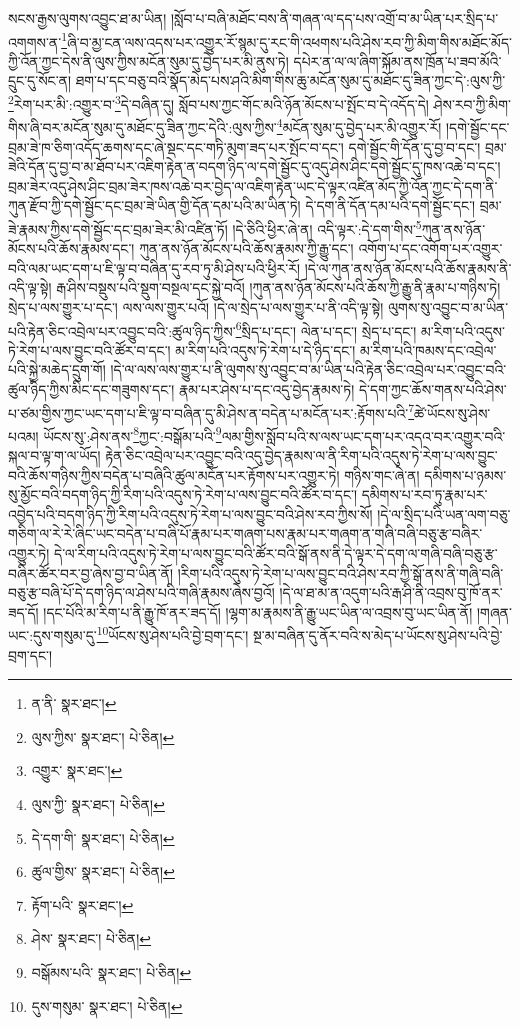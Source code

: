 སངས་རྒྱས་ལུགས་འབྱུང་ཐ་མ་ཡིན། །སློབ་པ་བཞི་མཐོང་བས་ནི་གཞན་ལ་དད་པས་འགྲོ་བ་མ་ཡིན་པར་སྲིད་པ་འགགས་ན་\footnote{ན་ནི་  སྣར་ཐང་། }ཞི་བ་མྱ་ངན་ལས་འདས་པར་འགྱུར་རོ་སྙམ་དུ་རང་གི་འཕགས་པའི་ཤེས་རབ་ཀྱི་མིག་གིས་མཐོང་མོད་ཀྱི་འོན་ཀྱང་དེས་ནི་ལུས་ཀྱིས་མངོན་སུམ་དུ་བྱེད་པར་མི་ནུས་ཏེ། དཔེར་ན་ལ་ལ་ཞིག་སྐོམ་ནས་ཁྲོན་པ་ཟབ་མོའི་དྲུང་དུ་སོང་ན། ཐག་པ་དང་བཅུ་བའི་སྣོད་མེད་པས་ཤའི་མིག་གིས་ཆུ་མངོན་སུམ་དུ་མཐོང་དུ་ཟིན་ཀྱང་དེ་:ལུས་ཀྱི་\footnote{ལུས་ཀྱིས་  སྣར་ཐང་།  པེ་ཅིན། }རེག་པར་མི་:འགྱུར་བ་\footnote{འགྱུར་  སྣར་ཐང་། }དེ་བཞིན་དུ། སློབ་པས་ཀྱང་གོང་མའི་ཉོན་མོངས་པ་སྤོང་བ་དེ་འདོད་དེ། ཤེས་རབ་ཀྱི་མིག་གིས་ཞི་བར་མངོན་སུམ་དུ་མཐོང་དུ་ཟིན་ཀྱང་དེའི་:ལུས་ཀྱིས་\footnote{ལུས་ཀྱི་  སྣར་ཐང་།  པེ་ཅིན། }མངོན་སུམ་དུ་བྱེད་པར་མི་འགྱུར་རོ། །དགེ་སྦྱོང་དང་བྲམ་ཟེ་ཁ་ཅིག་འདོད་ཆགས་དང་ཞེ་སྡང་དང་གཏི་མུག་ཟད་པར་སྤོང་བ་དང་། དགེ་སྦྱོང་གི་དོན་དུ་བྱ་བ་དང་། བྲམ་ཟེའི་དོན་དུ་བྱ་བ་མ་ཐོབ་པར་འཇིག་རྟེན་ན་བདག་ཉིད་ལ་དགེ་སྦྱོང་དུ་འདུ་ཤེས་ཤིང་དགེ་སྦྱོང་དུ་ཁས་འཆེ་བ་དང་། བྲམ་ཟེར་འདུ་ཤེས་ཤིང་བྲམ་ཟེར་ཁས་འཆེ་བར་བྱེད་ལ་འཇིག་རྟེན་ཡང་དེ་ལྟར་འཛིན་མོད་ཀྱི་འོན་ཀྱང་དེ་དག་ནི་ཀུན་རྫོབ་ཀྱི་དགེ་སྦྱོང་དང་བྲམ་ཟེ་ཡིན་གྱི་དོན་དམ་པའི་མ་ཡིན་ཏེ། དེ་དག་ནི་དོན་དམ་པའི་དགེ་སྦྱོང་དང་། བྲམ་ཟེ་རྣམས་ཀྱིས་དགེ་སྦྱོང་དང་བྲམ་ཟེར་མི་འཛིན་ཏོ། །དེ་ཅིའི་ཕྱིར་ཞེ་ན། འདི་ལྟར་:དེ་དག་གིས་\footnote{དེ་དག་གི་  སྣར་ཐང་།  པེ་ཅིན། }ཀུན་ནས་ཉོན་མོངས་པའི་ཆོས་རྣམས་དང་། ཀུན་ནས་ཉོན་མོངས་པའི་ཆོས་རྣམས་ཀྱི་རྒྱུ་དང་། འགོག་པ་དང་འགོག་པར་འགྱུར་བའི་ལམ་ཡང་དག་པ་ཇི་ལྟ་བ་བཞིན་དུ་རབ་ཏུ་མི་ཤེས་པའི་ཕྱིར་རོ། །དེ་ལ་ཀུན་ནས་ཉོན་མོངས་པའི་ཆོས་རྣམས་ནི་འདི་ལྟ་སྟེ། རྒ་ཤིས་བསྡུས་པའི་སྡུག་བསྔལ་དང་སྐྱེ་བའོ། །ཀུན་ནས་ཉོན་མོངས་པའི་ཆོས་ཀྱི་རྒྱུ་ནི་རྣམ་པ་གཉིས་ཏེ། སྲེད་པ་ལས་གྱུར་པ་དང་། ལས་ལས་གྱུར་པའོ། །དེ་ལ་སྲེད་པ་ལས་གྱུར་པ་ནི་འདི་ལྟ་སྟེ། ལུགས་སུ་འབྱུང་བ་མ་ཡིན་པའི་རྟེན་ཅིང་འབྲེལ་པར་འབྱུང་བའི་:ཚུལ་ཉིད་ཀྱིས་\footnote{ཚུལ་གྱིས་  སྣར་ཐང་།  པེ་ཅིན། }སྲིད་པ་དང་། ལེན་པ་དང་། སྲེད་པ་དང་། མ་རིག་པའི་འདུས་ཏེ་རེག་པ་ལས་བྱུང་བའི་ཚོར་བ་དང་། མ་རིག་པའི་འདུས་ཏེ་རེག་པ་དེ་ཉིད་དང་། མ་རིག་པའི་ཁམས་དང་འབྲེལ་པའི་སྐྱེ་མཆེད་དྲུག་གོ། །དེ་ལ་ལས་ལས་གྱུར་པ་ནི་ལུགས་སུ་འབྱུང་བ་མ་ཡིན་པའི་རྟེན་ཅིང་འབྲེལ་པར་འབྱུང་བའི་ཚུལ་ཉིད་ཀྱིས་མིང་དང་གཟུགས་དང་། རྣམ་པར་ཤེས་པ་དང་འདུ་བྱེད་རྣམས་ཏེ། དེ་དག་ཀྱང་ཆོས་གནས་པའི་ཤེས་པ་ཙམ་གྱིས་ཀྱང་ཡང་དག་པ་ཇི་ལྟ་བ་བཞིན་དུ་མི་ཤེས་ན་བདེན་པ་མངོན་པར་:རྟོགས་པའི་\footnote{རྟོག་པའི་  སྣར་ཐང་། }ཚེ་ཡོངས་སུ་ཤེས་པའམ། ཡོངས་སུ་:ཤེས་ནས་\footnote{ཤེས་  སྣར་ཐང་།  པེ་ཅིན། }ཀྱང་:བསྒོམ་པའི་\footnote{བསྒོམས་པའི་  སྣར་ཐང་།  པེ་ཅིན། }ལམ་གྱིས་སློབ་པའི་ས་ལས་ཡང་དག་པར་འདའ་བར་འགྱུར་བའི་སྐལ་བ་ལྟ་ག་ལ་ཡོད། རྟེན་ཅིང་འབྲེལ་པར་འབྱུང་བའི་འདུ་བྱེད་རྣམས་ལ་ནི་རིག་པའི་འདུས་ཏེ་རེག་པ་ལས་བྱུང་བའི་ཆོས་གཉིས་ཀྱིས་བདེན་པ་བཞིའི་ཚུལ་མངོན་པར་རྟོགས་པར་འགྱུར་ཏེ། གཉིས་གང་ཞེ་ན། དམིགས་པ་ཉམས་སུ་མྱོང་བའི་བདག་ཉིད་ཀྱི་རིག་པའི་འདུས་ཏེ་རེག་པ་ལས་བྱུང་བའི་ཚོར་བ་དང་། དམིགས་པ་རབ་ཏུ་རྣམ་པར་འབྱེད་པའི་བདག་ཉིད་ཀྱི་རིག་པའི་འདུས་ཏེ་རེག་པ་ལས་བྱུང་བའི་ཤེས་རབ་ཀྱིས་སོ། །དེ་ལ་སྲིད་པའི་ཡན་ལག་བཅུ་གཅིག་ལ་རེ་རེ་ཞིང་ཡང་བདེན་པ་བཞི་པོ་རྣམ་པར་གཞག་པས་རྣམ་པར་གཞག་ན་གཞི་བཞི་བཅུ་རྩ་བཞིར་འགྱུར་ཏེ། དེ་ལ་རིག་པའི་འདུས་ཏེ་རེག་པ་ལས་བྱུང་བའི་ཚོར་བའི་སྒོ་ནས་ནི་དེ་ལྟར་དེ་དག་ལ་གཞི་བཞི་བཅུ་རྩ་བཞིར་ཚོར་བར་བྱ་ཞེས་བྱ་བ་ཡིན་ནོ། །རིག་པའི་འདུས་ཏེ་རེག་པ་ལས་བྱུང་བའི་ཤེས་རབ་ཀྱི་སྒོ་ནས་ནི་གཞི་བཞི་བཅུ་རྩ་བཞི་པོ་དེ་དག་ཉིད་ལ་ཤེས་པའི་གཞི་རྣམས་ཞེས་བྱའོ། །དེ་ལ་ཐ་མ་ན་འདུག་པའི་རྒ་ཤི་ནི་འབྲས་བུ་ཁོ་ནར་ཟད་དོ། །དང་པོའི་མ་རིག་པ་ནི་རྒྱུ་ཁོ་ནར་ཟད་དོ། །ལྷག་མ་རྣམས་ནི་རྒྱུ་ཡང་ཡིན་ལ་འབྲས་བུ་ཡང་ཡིན་ནོ། །གཞན་ཡང་:དུས་གསུམ་དུ་\footnote{དུས་གསུམ་  སྣར་ཐང་།  པེ་ཅིན། }ཡོངས་སུ་ཤེས་པའི་བྱེ་བྲག་དང་། སྔ་མ་བཞིན་དུ་ནོར་བའི་ས་མེད་པ་ཡོངས་སུ་ཤེས་པའི་བྱེ་བྲག་དང་། 